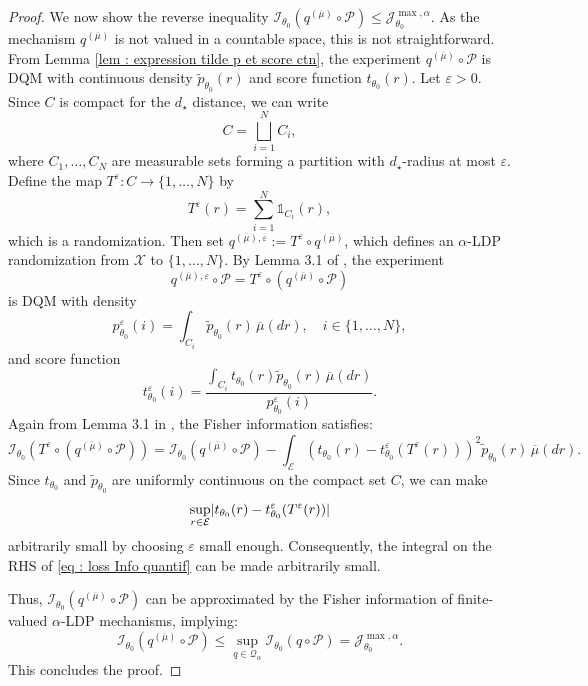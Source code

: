 \documentclass[a4paper, 11pt]{article}
\theoremstyle{definition}
\newcommand{\cE}{{\mathcal{E}}}
\newcommand{\cI}{{\mathcal{I}}}
\newcommand{\cJ}{{\mathcal{J}}}
\newcommand{\cP}{{\mathcal{P}}}
\newcommand{\cQ}{{\mathcal{Q}}}
\newcommand{\cX}{{\mathcal{X}}}
\newcommand{\theconvex}{C}
\newcommand{\indi}[1]{\mathds{1}_{#1}}
\DeclarePairedDelimiter{\abs}{\lvert}{\rvert}
\begin{document}
{\begin{proof}
We now show the reverse inequality \( \cI_{\theta_0}(q^{(\overline{\mu})} \circ \cP) \le \cJ^{\max,\alpha}_{\theta_0} \). As the mechanism \( q^{(\overline{\mu})} \) is not valued in a countable space, this is not straightforward. From Lemma \ref{lem : expression tilde p et score ctn}, the experiment \( q^{(\overline{\mu})} \circ \cP \) is DQM with continuous density \( \widetilde{p}_{\theta_0}(r) \) and score function \( t_{\theta_0}(r) \). Let \( \varepsilon > 0 \). Since \( \theconvex \) is compact for the \( d_\star \) distance, we can write
\[
\theconvex = \bigsqcup_{i=1}^N C_i,
\]
where \( C_1, \dots, C_N \) are measurable sets forming a partition with \( d_\star \)-radius at most \( \varepsilon \). Define the map \( T^\varepsilon: \theconvex \to \{1, \dots, N\} \) by
\[
T^\varepsilon(r) = \sum_{i=1}^N \indi{C_i}(r),
\]
which is a randomization. Then set \( q^{(\overline{\mu}), \varepsilon} := T^\varepsilon \circ q^{(\overline{\mu})} \), which defines an \( \alpha \)-LDP randomization from \( \cX \) to $\{1, \dots, N\}$.
By Lemma 3.1 of \cite{steinbergerEfficiencyLocalDifferent}, the experiment 
\[
q^{(\overline{\mu}),\varepsilon} \circ \cP 
= T^\varepsilon \circ (q^{(\overline{\mu})} \circ \cP)
\]
is DQM with density
\[
p^\varepsilon_{\theta_0}(i) = \int_{C_i} \widetilde{p}_{\theta_0}(r) \, \overline{\mu}(dr),
\quad i \in \{1, \dots, N\},
\]
and score function
\[
t^\varepsilon_{\theta_0}(i) = \frac{ \int_{C_i} t_{\theta_0}(r) \widetilde{p}_{\theta_0}(r) \, \overline{\mu}(dr) }{ p^\varepsilon_{\theta_0}(i) }.
\]
Again from Lemma 3.1 in \cite{steinbergerEfficiencyLocalDifferent}, the Fisher information satisfies:
\begin{equation} \label{eq : loss Info quantif}
\cI_{\theta_0}(T^\varepsilon \circ (q^{(\overline{\mu})} \circ \cP)) =
\cI_{\theta_0}(q^{(\overline{\mu})} \circ \cP) -
\int_\cE \left( t_{\theta_0}(r) - t^\varepsilon_{\theta_0}(T^\varepsilon(r)) \right)^2
\widetilde{p}_{\theta_0}(r) \, \overline{\mu}(dr).
\end{equation}
Since \( t_{\theta_0} \) and \( \widetilde{p}_{\theta_0} \) are uniformly continuous on the compact set \( \theconvex \), we can make
\[
\sup_{r \in \cE} \abs{ t_{\theta_0}(r) - t^\varepsilon_{\theta_0}(T^\varepsilon(r)) }
\]
arbitrarily small by choosing \( \varepsilon \) small enough. Consequently, the integral on the RHS of \eqref{eq : loss Info quantif} can be made arbitrarily small.

Thus, \( \cI_{\theta_0}(q^{(\overline{\mu})} \circ \cP) \) can be approximated by the Fisher information of finite-valued \( \alpha \)-LDP mechanisms, implying:
\[
\cI_{\theta_0}(q^{(\overline{\mu})} \circ \cP) \le \sup_{q \in \cQ_\alpha} \cI_{\theta_0}(q \circ \cP) = \cJ^{\max,\alpha}_{\theta_0}.
\]
This concludes the proof.
\end{proof}




}
\end{document}

